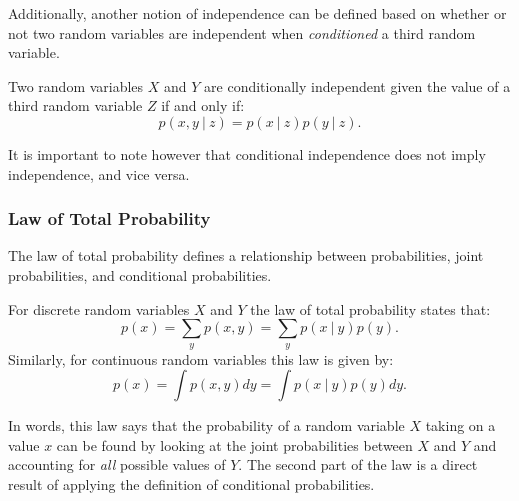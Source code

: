 Additionally, another notion of independence can be defined based on whether or not two random variables are independent when \textit{conditioned} a third random variable.
\begin{definition}
Two random variables $X$ and $Y$ are conditionally independent given the value of a third random variable $Z$ if and only if:
\begin{equation} \label{eq:condindep}
    p(x,y\:|\: z) = p(x \:|\: z) p(y \:|\: z).
\end{equation}
\end{definition}
It is important to note however that conditional independence does not imply independence, and vice versa.

\subsubsection{Law of Total Probability}
The law of total probability defines a relationship between probabilities, joint probabilities, and conditional probabilities.
\begin{definition}
For discrete random variables $X$ and $Y$ the law of total probability states that:
\begin{equation*}
    p(x) = \sum_y p(x,y) = \sum_y p(x \:|\: y) p(y). 
\end{equation*}
Similarly, for continuous random variables this law is given by:
\begin{equation*}
    p(x) = \int p(x,y) dy = \int p(x \:|\: y) p(y) dy. 
\end{equation*}
\end{definition}
In words, this law says that the probability of a random variable $X$ taking on a value $x$ can be found by looking at the joint probabilities between $X$ and $Y$ and accounting for \textit{all} possible values of $Y$. The second part of the law is a direct result of applying the definition of conditional probabilities.

